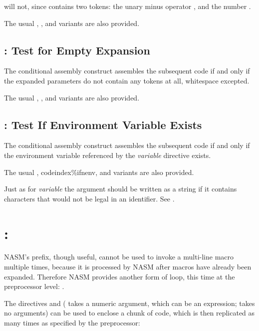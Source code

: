 will not, since  contains two tokens: the unary minus operator
\code{-}, and the number .

The usual , , and
 variants are also provided.

\subsection{: Test for Empty Expansion}
\label{subsec:ifempty}

The conditional assembly construct  assembles the
subsequent code if and only if the expanded parameters do not contain
any tokens at all, whitespace excepted.

The usual , , and
 variants are also provided.

\label{subsec:ifenv}
\subsection{: Test If Environment Variable Exists}

The conditional assembly construct  assembles the
subsequent code if and only if the environment variable referenced by
the \code{\%!}\emph{variable} directive exists.

The usual , codeindex{\%ifnenv}, and 
variants are also provided.

Just as for \code{\%!}\emph{variable} the argument should be written as a
string if it contains characters that would not be legal in an
identifier. See .

\section{: }
\label{sec:rep}

NASM's  prefix, though useful, cannot be used to invoke a
multi-line macro multiple times, because it is processed by NASM
after macros have already been expanded. Therefore NASM provides
another form of loop, this time at the preprocessor level: .

The directives  and  (
takes a numeric argument, which can be an expression; 
takes no arguments) can be used to enclose a chunk of code, which is then
replicated as many times as specified by the preprocessor:

